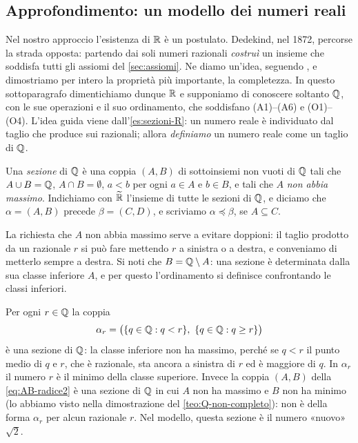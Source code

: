 \subsection{Approfondimento: un modello dei numeri reali}
\label{subsec:modello-reali}

Nel nostro approccio l'esistenza di $\mathbb{R}$ è un postulato. Dedekind, nel 1872, percorse la
strada opposta: partendo dai soli numeri razionali \emph{costruì} un insieme che
soddisfa tutti gli assiomi del \cref{sec:assiomi}. Ne diamo un'idea, seguendo
\cite{giusti}, e dimostriamo per intero la proprietà più importante, la completezza. In
questo sottoparagrafo dimentichiamo dunque $\mathbb{R}$ e supponiamo di conoscere soltanto $\Q$,
con le sue operazioni e il suo ordinamento, che soddisfano (A1)--(A6) e (O1)--(O4).
L'idea guida viene dall'\cref{es:sezioni-R}: un numero reale è individuato dal taglio
che produce sui razionali; allora \emph{definiamo} un numero reale come un taglio di
$\Q$.

\begin{definizione}[Sezione di $\Q$]\label{def:sezione-Q}
Una \emph{sezione} di $\Q$ è una coppia $(A,B)$ di sottoinsiemi non vuoti di $\Q$ tali
che $A\cup B=\mathbb{Q}$, $A\cap B=\emptyset$, $a<b$ per ogni $a\in A$ e $b\in B$, e tali che
$A$ \emph{non abbia massimo}. Indichiamo con $\widetilde{\mathbb{R}}$ l'insieme di tutte le
sezioni di $\Q$, e diciamo che $\alpha=(A,B)$ precede $\beta=(C,D)$, e scriviamo
$\alpha\preceq\beta$, se $A\subseteq C$.
\end{definizione}

La richiesta che $A$ non abbia massimo serve a evitare doppioni: il taglio prodotto da
un razionale $r$ si può fare mettendo $r$ a sinistra o a destra, e conveniamo di
metterlo sempre a destra. Si noti che $B=\mathbb{Q}\setminus A$: una sezione è determinata dalla
sua classe inferiore $A$, e per questo l'ordinamento si definisce confrontando le classi
inferiori.

\begin{esempio}\label{es:sezioni-Q}
Per ogni $r\in\mathbb{Q}$ la coppia
\[
  \alpha_{r}=\bigl(\{q\in\mathbb{Q} : q<r\},\ \{q\in\mathbb{Q} : q\ge r\}\bigr)
\]
è una sezione di $\Q$: la classe inferiore non ha massimo, perché se $q<r$ il punto
medio di $q$ e $r$, che è razionale, sta ancora a sinistra di $r$ ed è maggiore di $q$.
In $\alpha_{r}$ il numero $r$ è il minimo della classe superiore. Invece la coppia
$(A,B)$ della \eqref{eq:AB-radice2} è una sezione di $\Q$ in cui $A$ non ha massimo e $B$
non ha minimo (lo abbiamo visto nella dimostrazione del \cref{teo:Q-non-completo}):
non è della forma $\alpha_{r}$ per alcun razionale $r$. Nel modello, questa sezione è il
numero «nuovo» $\sqrt2$.
\end{esempio}

